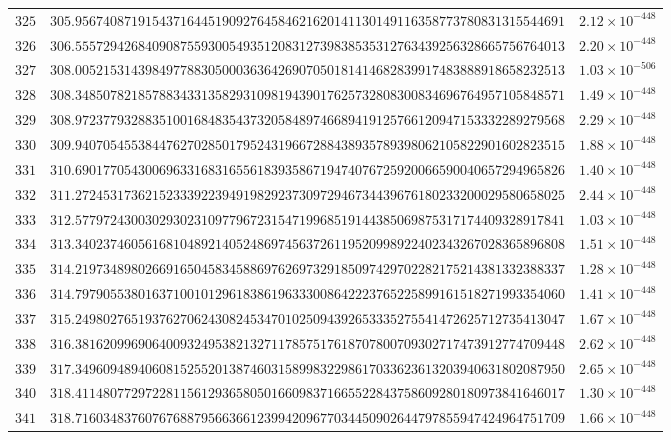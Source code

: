 \documentclass[12pt,reqno]{amsart}
\theoremstyle{remark}
\begin{document}
\begin{longtable}{clc}
$325$ & $305.9567408719154371644519092764584621620141130149116358773780831315544691$ & $2.12\times 10^{-448}$ \\
$326$ & $306.5557294268409087559300549351208312739838535312763439256328665756764013$ & $2.20\times 10^{-448}$ \\
$327$ & $308.0052153143984977883050003636426907050181414682839917483888918658232513$ & $1.03\times 10^{-506}$ \\
$328$ & $308.3485078218578834331358293109819439017625732808300834696764957105848571$ & $1.49\times 10^{-448}$ \\
$329$ & $308.9723779328835100168483543732058489746689419125766120947153332289279568$ & $2.29\times 10^{-448}$ \\
$330$ & $309.9407054553844762702850179524319667288438935789398062105822901602823515$ & $1.88\times 10^{-448}$ \\
$331$ & $310.6901770543006963316831655618393586719474076725920066590040657294965826$ & $1.40\times 10^{-448}$ \\
$332$ & $311.2724531736215233392239491982923730972946734439676180233200029580658025$ & $2.44\times 10^{-448}$ \\
$333$ & $312.5779724300302930231097796723154719968519144385069875317174409328917841$ & $1.03\times 10^{-448}$ \\
$334$ & $313.3402374605616810489214052486974563726119520998922402343267028365896808$ & $1.51\times 10^{-448}$ \\
$335$ & $314.2197348980266916504583458869762697329185097429702282175214381332388337$ & $1.28\times 10^{-448}$ \\
$336$ & $314.7979055380163710010129618386196333008642223765225899161518271993354060$ & $1.41\times 10^{-448}$ \\
$337$ & $315.2498027651937627062430824534701025094392653335275541472625712735413047$ & $1.67\times 10^{-448}$ \\
$338$ & $316.3816209969064009324953821327117857517618707800709302717473912774709448$ & $2.62\times 10^{-448}$ \\
$339$ & $317.3496094894060815255201387460315899832298617033623613203940631802087950$ & $2.65\times 10^{-448}$ \\
$340$ & $318.4114807729722811561293658050166098371665522843758609280180973841646017$ & $1.30\times 10^{-448}$ \\
$341$ & $318.7160348376076768879566366123994209677034450902644797855947424964751709$ & $1.66\times 10^{-448}$ \\

\end{longtable}
\end{document}
